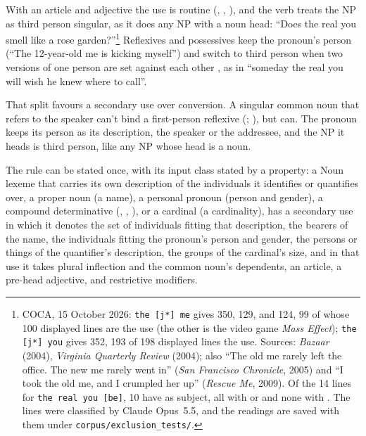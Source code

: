 \documentclass[12pt]{article}
\begin{document}
With an article and adjective the use is routine (, , ), and the verb treats the NP as third person singular, as it does any NP with a noun head: \enquote{Does the real you smell like a rose garden?}\footnote{COCA, 15 October 2026: \texttt{the [j*] me} gives  350,  129, and  124, 99 of whose 100 displayed lines are the use (the other is the video game \textit{Mass Effect}); \texttt{the [j*] you} gives  352, 193 of 198 displayed lines the use. Sources: \textit{Bazaar} (2004), \textit{Virginia Quarterly Review} (2004); also \enquote{The old me rarely left the office. The new me rarely went in} (\textit{San Francisco Chronicle}, 2005) and \enquote{I took the old me, and I crumpled her up} (\textit{Rescue Me}, 2009). Of the 14 lines for \texttt{the real you [be]}, 10 have  as subject, all with  or  and none with . The lines were classified by Claude Opus~5.5, and the readings are saved with them under \texttt{corpus/exclusion\_tests/}.} Reflexives and possessives keep the pronoun's person (\enquote{The 12-year-old me is kicking myself}) and switch to third person when two versions of one person are set against each other \citep[19, 29--30]{halm2021virtual}, as in \enquote{someday the real you will wish he knew where to call}.

That split favours a secondary use over conversion. A singular common noun that refers to the speaker can't bind a first-person reflexive (; \citealp[19]{halm2021virtual}), but  can. The pronoun keeps its person as its description, the speaker or the addressee, and the NP it heads is third person, like any NP whose head is a noun.

The rule can be stated once, with its input class stated by a property: a Noun lexeme that carries its own description of the individuals it identifies or quantifies over, a proper noun (a name), a personal pronoun (person and gender), a compound determinative (, , ), or a cardinal (a cardinality), has a secondary use in which it denotes the set of individuals fitting that description, the bearers of the name, the individuals fitting the pronoun's person and gender, the persons or things of the quantifier's description, the groups of the cardinal's size, and in that use it takes plural inflection and the common noun's dependents, an article, a pre-head adjective, and restrictive modifiers.
\end{document}
